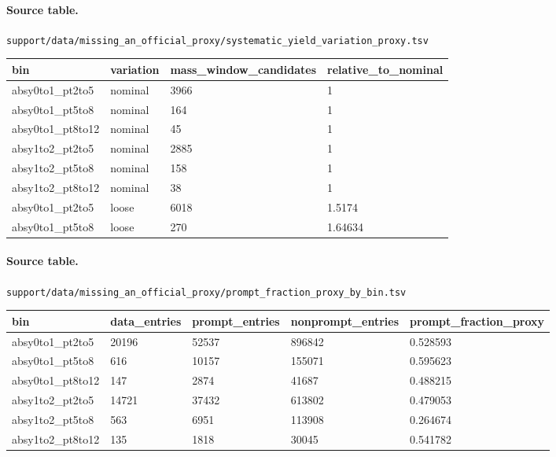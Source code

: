 \documentclass[11pt]{article}
\begin{document}
\paragraph{Source table.} \texttt{support/data/missing\_an\_official\_proxy/systematic\_yield\_variation\_proxy.tsv}
\begin{center}\scriptsize
\begin{tabular}{|l|l|l|l|}
\hline
bin & variation & mass\_window\_candidates & relative\_to\_nominal \\ \hline
absy0to1\_pt2to5 & nominal & 3966 & 1 \\ \hline
absy0to1\_pt5to8 & nominal & 164 & 1 \\ \hline
absy0to1\_pt8to12 & nominal & 45 & 1 \\ \hline
absy1to2\_pt2to5 & nominal & 2885 & 1 \\ \hline
absy1to2\_pt5to8 & nominal & 158 & 1 \\ \hline
absy1to2\_pt8to12 & nominal & 38 & 1 \\ \hline
absy0to1\_pt2to5 & loose & 6018 & 1.5174 \\ \hline
absy0to1\_pt5to8 & loose & 270 & 1.64634 \\ \hline
\end{tabular}
\end{center}
\paragraph{Source table.} \texttt{support/data/missing\_an\_official\_proxy/prompt\_fraction\_proxy\_by\_bin.tsv}
\begin{center}\scriptsize
\begin{tabular}{|l|l|l|l|l|}
\hline
bin & data\_entries & prompt\_entries & nonprompt\_entries & prompt\_fraction\_proxy \\ \hline
absy0to1\_pt2to5 & 20196 & 52537 & 896842 & 0.528593 \\ \hline
absy0to1\_pt5to8 & 616 & 10157 & 155071 & 0.595623 \\ \hline
absy0to1\_pt8to12 & 147 & 2874 & 41687 & 0.488215 \\ \hline
absy1to2\_pt2to5 & 14721 & 37432 & 613802 & 0.479053 \\ \hline
absy1to2\_pt5to8 & 563 & 6951 & 113908 & 0.264674 \\ \hline
absy1to2\_pt8to12 & 135 & 1818 & 30045 & 0.541782 \\ \hline
\end{tabular}
\end{center}
\end{document}
